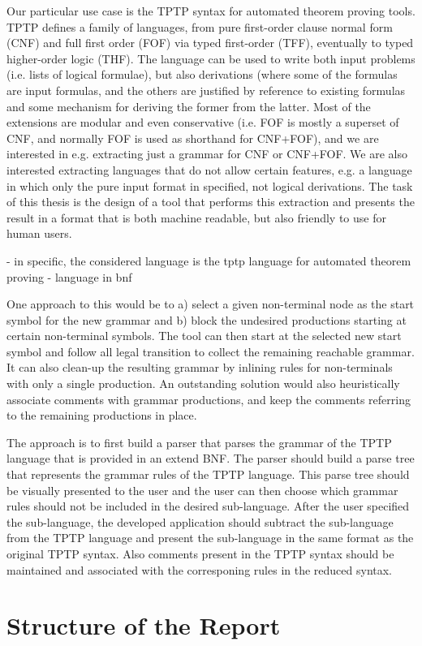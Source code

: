 Our particular use case is the TPTP syntax for automated theorem proving tools. TPTP defines a family of languages, from pure first-order clause normal form (CNF) and full first order (FOF) via typed first-order (TFF), eventually to typed higher-order logic (THF). The language can be used to write both input problems (i.e. lists of logical formulae), but also derivations (where some of the formulas are input formulas, and the others are justified by reference to existing formulas and some mechanism for deriving the former from the latter. Most of the extensions are modular and even conservative (i.e. FOF is mostly a superset of CNF, and normally FOF is used as shorthand for CNF+FOF), and we are interested in e.g. extracting just a grammar for CNF or CNF+FOF. We are also interested extracting languages that do not allow certain features, e.g. a language in which only the pure input format in specified, not logical derivations. The task of this thesis is the design of a tool that performs this extraction and presents the result in a format that is both machine readable, but also friendly to use for human users.

- in specific, the considered language is the tptp language for automated theorem proving
- language in bnf

One approach to this would be to a) select a given non-terminal node as the start symbol for the new grammar and b) block the undesired productions starting at certain non-terminal symbols. The tool can then start at the selected new start symbol and follow all legal transition to collect the remaining reachable grammar. It can also clean-up the resulting grammar by inlining rules for non-terminals with only a single production. An outstanding solution would also heuristically associate comments with grammar productions, and keep the comments referring to the remaining productions in place.


The approach is to first build a parser that parses the grammar of the \ac{TPTP} language that is provided in an extend \ac{BNF}. The parser should build a parse tree that represents the grammar rules of the \ac{TPTP} language. This parse tree should be visually presented to the user and the user can then choose which grammar rules should not be included in the desired sub-language. After the user specified the sub-language, the developed application should subtract the sub-language from the \ac{TPTP} language and present the sub-language in the same format as the original \ac{TPTP} syntax. Also comments present in the  \ac{TPTP} syntax should be maintained and associated with the corresponing rules in the reduced syntax.

\section{Structure of the Report}\label{sec:Structure}
